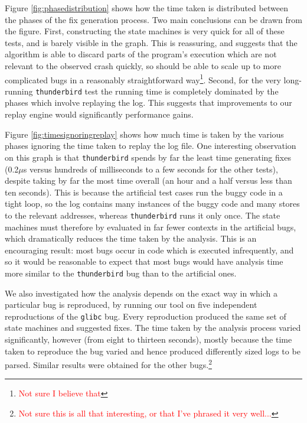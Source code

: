 \documentclass[10pt,twocolumn,preprint,natbib,authoryear]{sigplanconf}
\newcommand{\editorial}[1]{\textcolor{red}{\footnote{\textcolor{red}{#1}}}}
\begin{document}
Figure \ref{fig:phasedistribution} shows how the time taken is
distributed between the phases of the fix generation process.  Two
main conclusions can be drawn from the figure.  First, constructing
the state machines is very quick for all of these tests, and is barely
visible in the graph.  This is reassuring, and suggests that the
algorithm is able to discard parts of the program's execution which
are not relevant to the observed crash quickly, so should be able to
scale up to more complicated bugs in a reasonably straightforward
way\editorial{Not sure I believe that}.  Second, for the very
long-running \verb|thunderbird| test the running time is completely
dominated by the phases which involve replaying the log.  This
suggests that improvements to our replay engine would significantly
performance gains.

Figure \ref{fig:timesignoringreplay} shows how much time is taken by
the various phases ignoring the time taken to replay the log file.
One interesting observation on this graph is that \verb|thunderbird|
spends by far the least time generating fixes (0.2$\mu{}$s versus
hundreds of milliseconds to a few seconds for the other tests),
despite taking by far the most time overall (an hour and a half versus
less than ten seconds).  This is because the artificial test cases run
the buggy code in a tight loop, so the log contains many instances of
the buggy code and many stores to the relevant addresses, whereas
\verb|thunderbird| runs it only once.  The state machines must
therefore by evaluated in far fewer contexts in the artificial bugs,
which dramatically reduces the time taken by the analysis.  This is an
encouraging result: most bugs occur in code which is executed
infrequently, and so it would be reasonable to expect that most bugs
would have analysis time more similar to the \verb|thunderbird| bug
than to the artificial ones.

We also investigated how the analysis depends on the exact way in 
which a particular bug is reproduced, by running our tool
on five independent reproductions of the \verb|glibc| bug.  Every
reproduction produced the same set of state machines and suggested
fixes.  The time taken by the analysis process varied significantly,
however (from eight to thirteen seconds), mostly because the time
taken to reproduce the bug varied and hence produced differently sized
logs to be parsed. Similar results were obtained for the other
bugs.\editorial{Not sure this is all that interesting, or that I've
  phrased it very well...}
\end{document}

